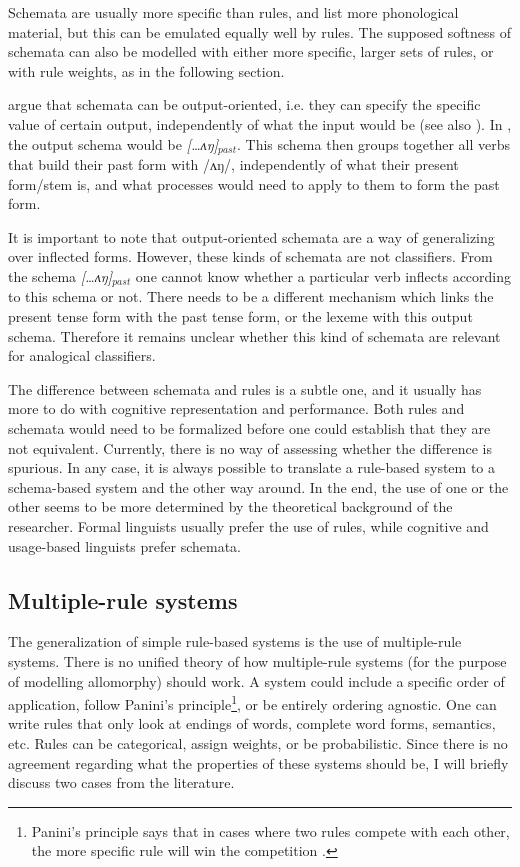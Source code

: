 Schemata are usually more specific than rules, and list more phonological material, but this can be emulated equally well by rules. The supposed softness of schemata can also be modelled with either more specific, larger sets of rules, or with rule weights, as in the following section.

\textcite[chapter 11.2--11.3]{Croft.2004} argue that schemata can be output-oriented, i.e. they can specify the specific value of certain output, independently of what the input would be (see also \citealt{Bybee.1995}). In , the output schema would be \textit{[\dots ʌŋ]$_{past}$}. This schema then groups together all verbs that build their past form with /ʌŋ/, independently of what their present form/stem is, and what processes would need to apply to them to form the past form.

It is important to note that output-oriented schemata are a way of generalizing over inflected forms. However, these kinds of schemata are not classifiers. From the schema \textit{[\dots ʌŋ]$_{past}$} one cannot know whether a particular verb inflects according to this schema or not. There needs to be a different mechanism which links the present tense form with the past tense form, or the lexeme with this output schema. Therefore it remains unclear whether this kind of schemata are relevant for analogical classifiers.

The difference between schemata and rules is a subtle one, and it usually has more to do with cognitive representation and performance. Both rules and schemata would need to be formalized before one could establish that they are not equivalent. Currently, there is no way of assessing whether the difference is spurious. In any case, it is always possible to translate a rule-based system to a schema-based system and the other way around. In the end, the use of one or the other seems to be more determined by the theoretical background of the researcher. Formal linguists usually prefer the use of rules, while cognitive and usage-based linguists prefer schemata.


\subsection{Multiple-rule systems}


The generalization of simple rule-based systems is the use of multiple-rule systems. There is no unified theory of how multiple-rule systems (for the purpose of modelling allomorphy) should work. A system could include a specific order of application, follow Panini's principle\footnote{Panini's principle says that in cases where two rules compete with each other, the more specific rule will win the competition \autocite{Zwicky.1986}.}, or be entirely ordering agnostic. One can write rules that only look at endings of words, complete word forms, semantics, etc. Rules can be categorical, assign weights, or be probabilistic.  Since there is no agreement regarding what the properties of these systems should be, I will briefly discuss two cases from the literature.

